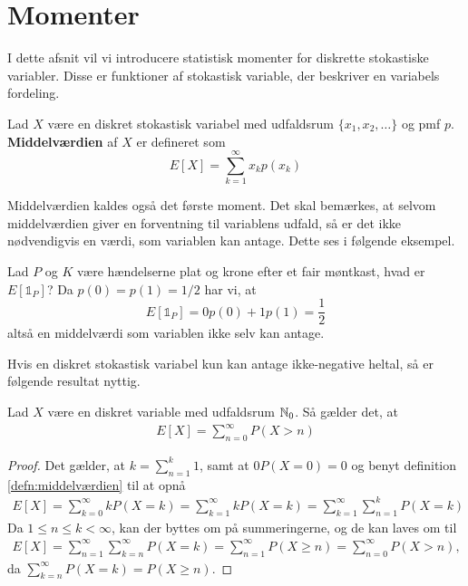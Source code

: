 \section{Momenter}
I dette afsnit vil vi introducere statistisk momenter for diskrette stokastiske variabler. Disse er funktioner af stokastisk variable, der beskriver en variabels fordeling. 

\begin{defn}\label{defn:middelværdien} %
    Lad $X$ være en diskret stokastisk variabel med udfaldsrum $\{x_1, x_2, \ldots\}$ og pmf $p$. \textbf{Middelværdien} af $X$ er defineret som
    \begin{equation*}
        E[X] = \sum^\infty_{k = 1} x_k p(x_k)
    \end{equation*}
\end{defn}
Middelværdien kaldes også det første moment.  Det skal bemærkes, at selvom middelværdien giver en forventning til variablens udfald, så er det ikke nødvendigvis en værdi, som variablen kan antage. Dette ses i følgende eksempel.

\begin{exmp}
  Lad $P$ og $K$ være hændelserne plat og krone efter et fair møntkast, hvad er $E[\mathbb{1}_{P}]$?
  Da $p(0) = p(1) = 1/2$ har vi, at
  \begin{equation*}
    E[\mathbb{1}_{P}] = 0p(0) + 1p(1) = \frac{1}{2}
  \end{equation*}
  altså en middelværdi som variablen ikke selv kan antage.
\end{exmp}

Hvis en diskret stokastisk variabel kun kan antage ikke-negative heltal, så er følgende resultat nyttig.

\begin{prop} \label{prop:2.9}%
Lad $X$ være en diskret variable med udfaldsrum $\mathbb{N}_0$. Så gælder det, at
\begin{align*}
    E[X] = \sum^\infty_{n = 0} P(X > n)
\end{align*}
\end{prop}
\begin{proof}
    Det gælder, at $k = \sum^k_{n = 1} 1$, samt at $0P(X=0)=0$ og benyt definition \ref{defn:middelværdien} til at opnå
    \begin{align*}
        E[X] = \sum^\infty_{k = 0} k P(X = k)
        = \sum^\infty_{k = 1} k P(X = k)
        = \sum^\infty_{k = 1} \sum^k_{n = 1} P(X = k) 
\end{align*}
        Da $1\leq n \leq k < \infty$, kan der byttes om på summeringerne, og de kan laves om til
\begin{align*}
    E[X] = \sum^\infty_{n = 1} \sum^\infty_{k = n} P(X = k) = \sum^\infty_{n = 1} P(X \geq n) = \sum^\infty_{n = 0} P(X > n),
    \end{align*}
    da $\sum^\infty_{k = n} P(X = k) = P(X \geq n)$. 
\end{proof}

